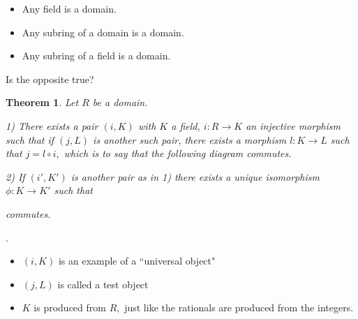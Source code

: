 \documentclass{amsart}
\newtheorem{thm}{Theorem}[section]
\theoremstyle{definition}
\theoremstyle{remark}
\begin{document}
\begin{itemize}
        \item Any field is a domain.
        \item Any subring of a domain is a domain.
        \item Any subring of a field is a domain.
    \end{itemize}

Is the opposite true?
\begin{thm}
Let $R$ be a domain.

1) There exists a pair $(i,K)$ with $K$ a field, $i:R\rightarrow K$ an injective morphism such that if $(j,L)$ is another such pair, there exists a morphism $l:K\rightarrow L$ such that $j=l\circ i,$ which is to say that the following diagram commutes.


2) If $(i',K')$ is another pair as in 1) there exists a unique isomorphism $\phi:K\rightarrow K'$ such that 

 commutes.

\end{thm}

\rmk.

\begin{itemize}
	\item $(i,K)$ is an example of a ``universal object"
	\item $(j,L)$ is called a test object
	\item $K$ is produced from $R,$ just like the rationals are produced from the integers.
\end{itemize}
\end{document}
